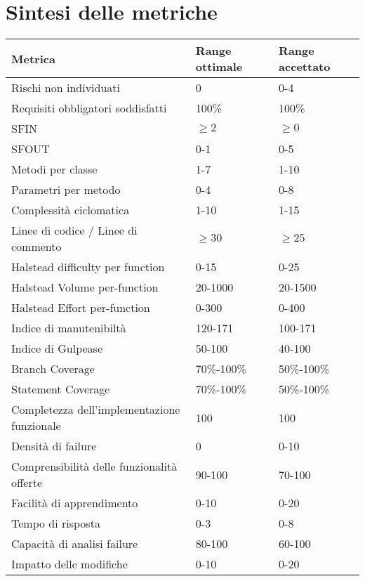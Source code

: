 \section{Sintesi delle metriche}
\begin{longtable}[H]{|C{5cm}|C{3.5cm}|C{3.5cm}|}
		\hline
		\textbf{Metrica} & \textbf{Range ottimale} & \textbf{Range accettato}  \\ \hline
		Rischi non individuati & 0 & 0-4 \\ \hline
		Requisiti obbligatori soddisfatti & 100\% & 100\% \\ \hline
		SFIN & $\geq 2$ & $\geq 0$ \\ \hline
		SFOUT & 0-1 & 0-5 \\ \hline
		Metodi per classe & 1-7 & 1-10 \\ \hline
		Parametri per metodo & 0-4 & 0-8 \\ \hline
		Complessità ciclomatica & 1-10 & 1-15 \\ \hline
		Linee di codice / Linee di commento & $\geq30$ & $\geq25$ \\ \hline
		Halstead difficulty per function & 0-15 & 0-25 \\ \hline
		Halstead Volume per-function & 20-1000 &  20-1500 \\ \hline
		Halstead Effort per-function & 0-300 & 0-400 \\ \hline
		Indice di manutenibiltà & 120-171 & 100-171 \\ \hline
		Indice di Gulpease & 50-100 & 40-100 \\ \hline
		Branch Coverage & 70\%-100\% & 50\%-100\% \\ \hline
		Statement Coverage & 70\%-100\% & 50\%-100\% \\ \hline
		Completezza dell'implementazione funzionale & 100 & 100 \\ \hline
		Densità di failure & 0 & 0-10 \\ \hline
		Comprensibilità delle funzionalità offerte & 90-100 & 70-100 \\ \hline
		Facilità di apprendimento & 0-10 & 0-20 \\ \hline
		Tempo di risposta & 0-3 & 0-8 \\ \hline
		Capacità di analisi failure & 80-100 & 60-100 \\ \hline
		Impatto delle modifiche & 0-10 & 0-20 \\ \hline
\end{longtable}